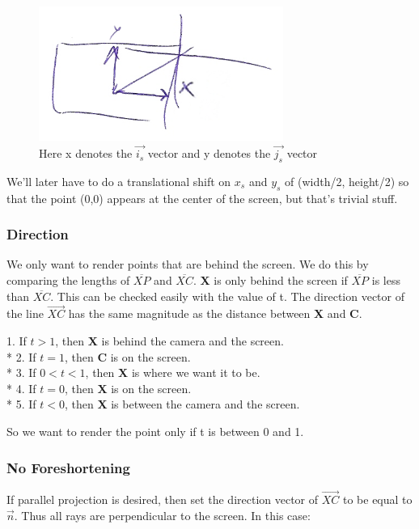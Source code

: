 \documentclass[12pt]{article}
\begin{document}
		\begin{figure}[ht!] 
		\centering
		\includegraphics[width=8cm]{3.png}
		\caption{Here x denotes the $\vec{i_{s}}$ vector and y denotes the $\vec{j_{s}}$ vector} \label{im:3}		
		\end{figure}
	
	We'll later have to do a translational shift on $x_{s}$ and $y_{s}$ of (width/2, height/2) so that the point (0,0) appears at the center of the screen, but that's trivial stuff.

	\subsubsection*{Direction}
	
	We only want to render points that are behind the screen. We do this by comparing the lengths of $\overline{XP}$ and $\overline{XC}$. \textbf{X} is only behind the screen if $\overline{XP}$ is less than $\overline{XC}$. This can be checked easily with the value of t. The direction vector of the line $\overrightarrow{XC}$ has the same magnitude as the distance between \textbf{X} and \textbf{C}.
	
		1. If $t > 1$, then \textbf{X} is behind the camera and the screen. \\*
		2. If $t = 1$, then \textbf{C} is on the screen. \\*
		3. If $0 < t < 1$, then \textbf{X} is where we want it to be. \\*
		4. If $t = 0$, then \textbf{X} is on the screen. \\*
		5. If $t < 0$, then \textbf{X} is between the camera and the screen.
		
	So we want to render the point only if t is between 0 and 1.
	
	\subsubsection*{No Foreshortening}
	
	If parallel projection is desired, then set the direction vector of $\overrightarrow{XC}$ to be equal to $\vec{n}$. Thus all rays are perpendicular to the screen. In this case:
	
\end{document}
